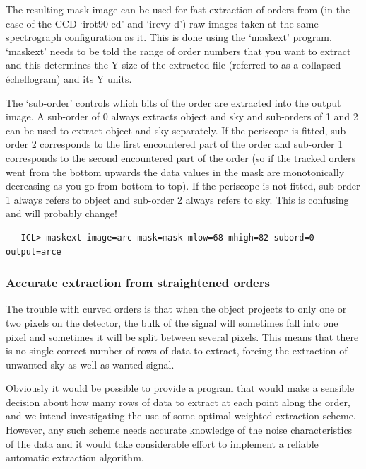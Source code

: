    The resulting mask image can be used for fast extraction of orders
   from (in the case of the CCD `irot90-ed' and `irevy-d') raw images
   taken at the same spectrograph configuration as it. This is done
   using the `maskext' program. `maskext' needs to be told the range
   of order numbers that you want to extract and this determines the Y
   size of the extracted file (referred to as a collapsed \'echellogram)
   and its Y units.

   The `sub-order' controls which bits of the order are extracted into
   the output image. A sub-order of 0 always extracts object and sky and
   sub-orders of 1 and 2 can be used to extract object and sky
   separately. If the periscope is fitted, sub-order 2 corresponds to
   the first encountered part of the order and sub-order 1 corresponds
   to the second encountered part of the order (so if the tracked orders
   went from the bottom upwards the data values in the mask are
   monotonically decreasing as you go from bottom to top). If the
   periscope is not fitted, sub-order 1 always refers to object and
   sub-order 2 always refers to sky. This is confusing and will probably
   change!

\begin{verbatim}
   ICL> maskext image=arc mask=mask mlow=68 mhigh=82 subord=0 output=arce
\end{verbatim}


\subsubsection{\label{techno13accurate}
   Accurate extraction from straightened orders}

   The trouble with curved orders is that when the object projects to
   only one or two pixels on the detector, the bulk of the signal will
   sometimes fall into one pixel and sometimes it will be split between
   several pixels. This means that there is no single correct number of
   rows of data to extract, forcing the extraction of unwanted sky as
   well as wanted signal.

   Obviously it would be possible to provide a program that would make
   a sensible decision about how many rows of data to extract at each
   point along the order, and we intend investigating the use of some
   optimal weighted extraction scheme. However, any such scheme needs
   accurate knowledge of the noise characteristics of the data and it
   would take considerable effort to implement a reliable automatic
   extraction algorithm.

